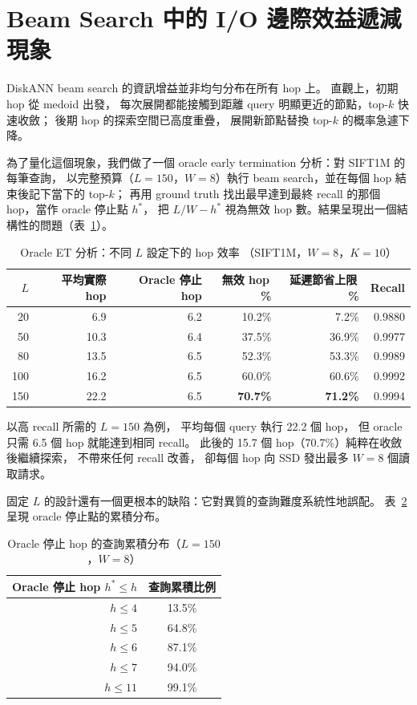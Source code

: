 \section{Beam Search 中的 I/O 邊際效益遞減現象}
\label{sec:mot-diminishing}

DiskANN beam search 的資訊增益並非均勻分布在所有 hop 上。
直觀上，初期 hop 從 medoid 出發，
每次展開都能接觸到距離 query 明顯更近的節點，top-$k$ 快速收斂；
後期 hop 的探索空間已高度重疊，
展開新節點替換 top-$k$ 的概率急遽下降。

為了量化這個現象，我們做了一個 oracle early termination 分析：對 SIFT1M 的每筆查詢，
以完整預算（$L=150$，$W=8$）執行 beam search，並在每個 hop 結束後記下當下的 top-$k$；
再用 ground truth 找出最早達到最終 recall 的那個 hop，當作 oracle 停止點 $h^*$，
把 $L/W - h^*$ 視為無效 hop 數。結果呈現出一個結構性的問題（表~\ref{tab:oracle-summary}）。

\begin{table}[h]
\centering
\caption{Oracle ET 分析：不同 $L$ 設定下的 hop 效率
（SIFT1M，$W = 8$，$K = 10$）}
\label{tab:oracle-summary}
\begin{tabular}{rrrrrr}
\hline
$L$ & 平均實際 hop & Oracle 停止 hop & 無效 hop\,\% & 延遲節省上限\,\% & Recall \\
\hline
 20 &  6.9 & 6.2 & 10.2\% &  7.2\% & 0.9880 \\
 50 & 10.3 & 6.4 & 37.5\% & 36.9\% & 0.9977 \\
 80 & 13.5 & 6.5 & 52.3\% & 53.3\% & 0.9989 \\
100 & 16.2 & 6.5 & 60.0\% & 60.6\% & 0.9992 \\
150 & 22.2 & 6.5 & \textbf{70.7\%} & \textbf{71.2\%} & 0.9994 \\
\hline
\end{tabular}
\end{table}

以高 recall 所需的 $L = 150$ 為例，
平均每個 query 執行 22.2 個 hop，
但 oracle 只需 6.5 個 hop 就能達到相同 recall。
此後的 15.7 個 hop（70.7\%）純粹在收斂後繼續探索，
不帶來任何 recall 改善，
卻每個 hop 向 SSD 發出最多 $W = 8$ 個讀取請求。

固定 $L$ 的設計還有一個更根本的缺陷：它對異質的查詢難度系統性地誤配。
表~\ref{tab:oracle-cdf} 呈現 oracle 停止點的累積分布。

\begin{table}[h]
\centering
\caption{Oracle 停止 hop 的查詢累積分布（$L=150$，$W=8$）}
\label{tab:oracle-cdf}
\begin{tabular}{rc}
\hline
Oracle 停止 hop $h^* \leq h$ & 查詢累積比例 \\
\hline
$h \leq 4$ & 13.5\% \\
$h \leq 5$ & 64.8\% \\
$h \leq 6$ & 87.1\% \\
$h \leq 7$ & 94.0\% \\
$h \leq 11$ & 99.1\% \\
\hline
\end{tabular}
\end{table}


